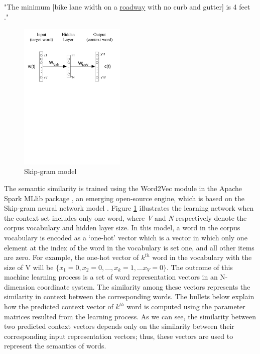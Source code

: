 \documentclass[Journal, BackFigs, DoubleSpace]{ascelike}%
\begin{document}
%
\begin{center}
	"The minimum [bike lane width on a \underline{roadway} with no curb and gutter] is 4 feet ."
\end{center}
%
%
\begin{figure}[t]
	\centering
	\includegraphics[width=0.45\textwidth]{Figure4_skip-gram-model}
	\caption{Skip-gram model}
	\label{fig:skip-gram}
\end{figure}
%
The semantic similarity is trained using the Word2Vec module in the Apache Spark MLlib package \cite{apache16}, an emerging open-source engine, which is based on the Skip-gram neural network model \cite{mikolov13a}. Figure \ref{fig:skip-gram} illustrates the learning network when the context set includes only one word, where \textit{V} and \textit{N} respectively denote the corpus vocabulary and hidden layer size. In this model, a word in the corpus vocabulary is encoded as a `one-hot' vector which is a vector in which only one element at the index of the word in the vocabulary is set one, and all other items are zero. For example, the one-hot vector of $k^{th}$ word in the vocabulary with the size of V will be $\{x_1=0, x_2=0, ..., x_k=1,...x_V=0\}$. The outcome of this machine learning process is a set of word representation vectors in an N-dimension coordinate system. The similarity among these vectors represents the similarity in context between the corresponding words. The bullets below explain how the predicted context vector of $k^{th}$ word is computed using the parameter matrices resulted from the learning process. As we can see, the similarity between two predicted context vectors depends only on the similarity between their corresponding input representation vectors; thus, these vectors are used to represent the semantics of  words. 
\end{document}
